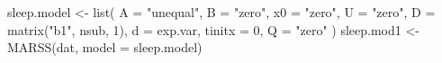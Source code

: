 \begin{Schunk}
\begin{Sinput}
 sleep.model <- list(
   A = "unequal", B = "zero", x0 = "zero", U = "zero",
   D = matrix("b1", nsub, 1), d = exp.var, tinitx = 0, Q = "zero"
 )
 sleep.mod1 <- MARSS(dat, model = sleep.model)
\end{Sinput}
\end{Schunk}
